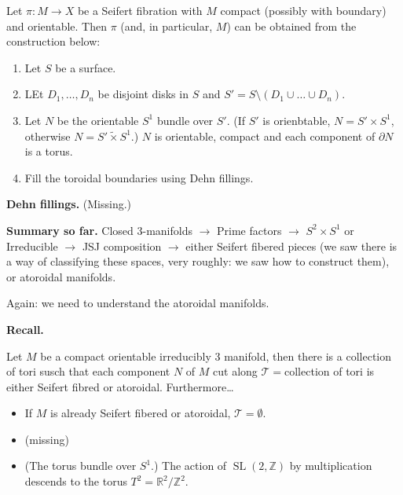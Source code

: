 \begin{theorem}[Seifert, 1933]
\label{theorem-seifert33}
Let $\pi:M \to X$ be a Seifert fibration
with $M$ compact (possibly with boundary)
and orientable. Then $\pi$ (and, in
particular, $M$) can be obtained from the
construction below:
\begin{enumerate}
\item Let $S$ be a surface.
\item LEt $D_1,…,D_n$ be disjoint disks
in $S$ and $S'=S\setminus(D_1 \cup  …
\cup D_n)$.
\item Let $N$ be the orientable $S^1$ bundle
over $S'$. (If $S'$ is orienbtable,
$N=S' \times S^1$, otherwise 
$N=S' \tilde{\times}S^1$.)
$N$ is orientable, compact and each
component of $\partial N$ is a torus.
\item Fill the toroidal boundaries using
Dehn fillings.
\end{enumerate}
\end{theorem}

\medskip\noindent
{\bf Dehn fillings.} (Missing.)

\medskip\noindent
{\bf Summary so far.}
Closed 3-manifolds $\to$ Prime factors
$\to$ $S^2 \times S^1$ or Irreducible
$\to$ JSJ composition
$\to$ either Seifert fibered pieces
(we saw there is a way of classifying these
spaces, very roughly: we saw how to
construct them), or atoroidal manifolds.

Again: we need to understand the atoroidal
manifolds.

\medskip\noindent
{\bf Recall.}

\begin{theorem}
\label{theorem-jsj-decompositionv2}
Let $M$ be a compact orientable irreducibly
3 manifold, then there is a collection of
tori susch that each component $N$ of $M$
cut along $\mathcal{T}=$collection of tori
is either Seifert fibred or atoroidal.
Furthermore…
\end{theorem}

\begin{example}
\label{example-jsj-decompositionv2}
\begin{itemize}
\item If $M$ is already Seifert fibered or
atoroidal, $\mathcal{T} = \emptyset$.
\item  (missing)
\item (The torus bundle over $S^1$.)
The action of
$\operatorname{SL}(2,\mathbb{Z})$
by multiplication descends to the torus
$T^2 = \mathbb{R}^2/\mathbb{Z}^2$.
\end{itemize}
\end{example}

